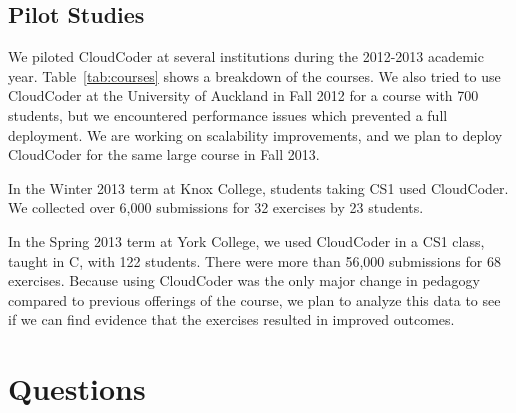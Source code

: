 \documentclass{sig-alternate}
\begin{document}
\subsection{Pilot Studies}

We piloted CloudCoder at several institutions during the 2012-2013
academic year.  Table~\ref{tab:courses} shows a breakdown of the
courses.  We also tried to use CloudCoder at the University of Auckland in Fall 2012 for a
course with 700 students, but we encountered performance issues
which prevented a full deployment.  We are working on scalability
improvements, and we plan to deploy CloudCoder for
the same large course in Fall 2013.

In the Winter 2013 term at Knox College, students taking CS1 used CloudCoder.
We collected over 6,000 submissions
for 32 exercises by 23 students.

In the Spring 2013 term at York College, we used CloudCoder in a CS1
class, taught in C, with 122 students.  There were more than 56,000
submissions for 68 exercises.  Because using CloudCoder was the
only major change in pedagogy compared to previous offerings of the course,
we plan to analyze this data to see if we can find evidence that
the exercises resulted in improved outcomes.



\section{Questions}\label{sec:questions}

%
\end{document}
